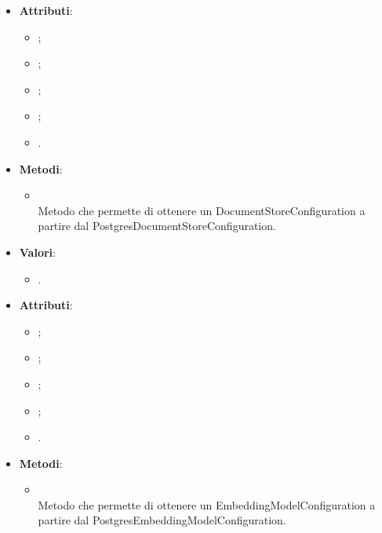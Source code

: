 \documentclass[10pt, a4paper]{article}
\begin{document}
\label{PostgresDocumentStoreConfigurationDettaglio}
\begin{itemize}
    \item \textbf{Attributi}:
    \begin{itemize}
        \item {};
        \item {};
        \item {};
        \item {};
        \item {}.  
    \end{itemize}
    \item \textbf{Metodi}:
    \begin{itemize}
        \item {}\\ 
        Metodo che permette di ottenere un DocumentStoreConfiguration a partire dal PostgresDocumentStoreConfiguration.
    \end{itemize}
\end{itemize}

\label{PostgresDocumentStoreTypeDettaglio}
\begin{itemize}
    \item \textbf{Valori}:
    \begin{itemize}
        \item {}. 
    \end{itemize}
\end{itemize}



\label{PostgresEmbeddingModelConfigurationDettaglio}
\begin{itemize}
    \item \textbf{Attributi}:
    \begin{itemize}
        \item {};
        \item {};
        \item {};
        \item {};
        \item {}.  
    \end{itemize}
    \item \textbf{Metodi}:
    \begin{itemize}
        \item {}\\ 
        Metodo che permette di ottenere un EmbeddingModelConfiguration a partire dal PostgresEmbeddingModelConfiguration.
    \end{itemize}
\end{itemize}
\end{document}
